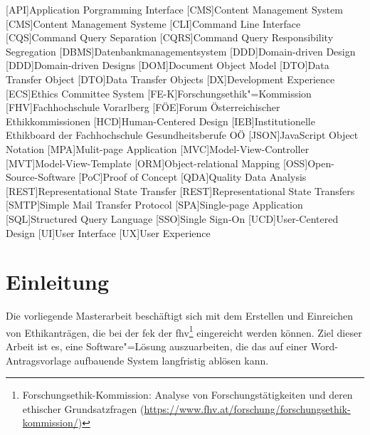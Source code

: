 \documentclass[a4paper,12pt,twoside]{scrreprt}
\begin{document}
\begin{acronym}
    [API]{Application Porgramming Interface}
    [CMS]{Content Management System}
    [CMS]{Content Management Systeme}
    [CLI]{Command Line Interface}
    [CQS]{Command Query Separation}
    [CQRS]{Command Query Responsibility Segregation}
    [DBMS]{Datenbankmanagementsystem}
    [DDD]{Domain-driven Design}
    [DDD]{Domain-driven Designs}
    [DOM]{Document Object Model}
    [DTO]{Data Transfer Object}
    [DTO]{Data Transfer Objects}
    [DX]{Development Experience}
    [ECS]{Ethics Committee System}
    [FE-K]{Forschungsethik"=Kommission}
    [FHV]{Fachhochschule Vorarlberg}
    [FÖE]{Forum Österreichischer Ethikkommissionen}
    [HCD]{Human-Centered Design}
    [IEB]{Institutionelle Ethikboard der Fachhochschule Gesundheitsberufe OÖ}
    [JSON]{JavaScript Object Notation}
    [MPA]{Mulit-page Application}
    [MVC]{Model-View-Controller}
    [MVT]{Model-View-Template}
    [ORM]{Object-relational Mapping}
    [OSS]{Open-Source-Software}
    [PoC]{Proof of Concept}
    [QDA]{Quality Data Analysis}
    [REST]{Representational State Transfer}
    [REST]{Representational State Transfers}
    [SMTP]{Simple Mail Transfer Protocol}
    [SPA]{Single-page Application}
    [SQL]{Structured Query Language}
    [SSO]{Single Sign-On}
    [UCD]{User-Centered Design}
    [UI]{User Interface}
    [UX]{User Experience}
\end{acronym}

\cleardoublepage
{}

\chapter{Einleitung}
\label{chap:einleitung}

Die vorliegende Masterarbeit beschäftigt sich mit dem Erstellen und Einreichen von Ethikanträgen, die bei der \ac{fek} der \ac{fhv}\footnote{Forschungsethik-Kommission: Analyse von Forschungstätigkeiten und deren ethischer Grundsatzfragen (\url{https://www.fhv.at/forschung/forschungsethik-kommission/})} eingereicht werden können. Ziel dieser Arbeit ist es, eine Software"=Lösung auszuarbeiten, die das auf einer Word-Antragsvorlage aufbauende System langfristig ablösen kann.
\end{document}
